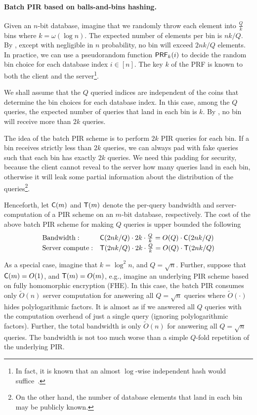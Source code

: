 {\paragraph{Batch PIR based on balls-and-bins hashing.}
Given an $n$-bit database, imagine that we randomly throw each element
into $\frac{Q}{k}$ bins where %
$k = \omega(\log n)$.
The expected number of elements per bin is 
$n k /Q$. 
By ,
except with negligible in $n$ probability,
no bin will exceed $2 n k /Q$ elements.
In practice, we can use a pseudorandom function ${\sf PRF}_k(i)$
to decide the random bin 
choice for each database index $i \in [n]$. 
The key $k$ of the PRF is 
known to both the client and the server\footnote{In fact,
it is known that an almost 
$\log$-wise independent hash would suffice~\cite{logwise}.}.


We shall assume that the $Q$ queried indices are independent
of the coins that determine the bin choices for each database index.
In this case, among the $Q$ queries, 
 the expected number of queries  
that land in each bin 
is $k$. 
By , 
no bin will receive more than $2k$ queries.

The idea of the batch PIR scheme
is to perform $2k$ PIR queries for each bin.  
If a bin receives strictly less than $2k$ queries, we can always
pad with fake queries such that each bin has exactly $2k$ queries.
We need this padding for security, 
because the client cannot reveal  
to the server how many queries land in each bin, otherwise
it will leak some partial information about the 
distribution of the queries\footnote{On the other hand, the number of database elements
that land in each bin may be publicly known.}.


Henceforth, let ${\sf C}(m)$ 
and ${\sf T}(m)$
denote the per-query bandwidth and server-computation 
of a PIR scheme on an $m$-bit database, 
respectively.
The cost of the above batch
PIR scheme for making $Q$ queries is upper bounded 
the following
\[
\begin{array}{ll}
\text{Bandwidth}: & {\sf C}(2nk/Q) \cdot 2k \cdot \frac{Q}{k}  =  O(Q) \cdot {\sf C}(2nk/Q) \\[2pt]
\text{Server compute}: &   {\sf T}(2nk/Q) \cdot 2k  \cdot \frac{Q}{k}
= O(Q) \cdot  {\sf T}(2nk/Q) 
\end{array}
\]

As a special case, imagine that $k = \log^2 n$, 
and $Q = \sqrt{n}$. Further, suppose that  
${\sf C}(m) = O(1)$, 
and ${\sf T}(m) = O(m)$, e.g., 
imagine an underlying PIR scheme based on fully homomorphic
encryption (FHE).
In this case, 
the batch PIR consumes only $\widetilde{O}(n)$  
server computation for answering all $Q = \sqrt{n}$ queries where $\widetilde{O}(\cdot)$ hides polylogarithmic factors.
It is almost as if we answered all $Q$
queries with the computation overhead of just a single 
query (ignoring polylogarithmic factors).
Further, the total bandwidth
is only $\widetilde{O}(n)$ for answering   
all $Q = \sqrt{n}$ queries. The bandwidth is not too much worse
than a simple $Q$-fold repetition of the underlying PIR.



}

